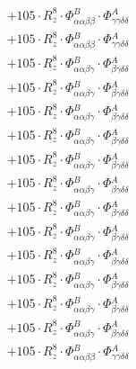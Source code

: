 \documentclass{article}
\begin{document}
\begin{subequations}
\begin{gather}
\begin{array}{c}
 \\[0.2em] 		 + 105 \cdot R_{z}^{8} \cdot \Phi{}^{B}_{\alpha{}\alpha{}\beta{}\beta{}} \cdot \Phi{}^{A}_{\gamma{}\gamma{}\delta{}\delta{}} 
 \\[0.2em] 		 + 105 \cdot R_{z}^{8} \cdot \Phi{}^{B}_{\alpha{}\alpha{}\beta{}\beta{}} \cdot \Phi{}^{A}_{\gamma{}\gamma{}\delta{}\delta{}} 
 \\[0.2em] 		 + 105 \cdot R_{z}^{8} \cdot \Phi{}^{B}_{\alpha{}\alpha{}\beta{}\gamma{}} \cdot \Phi{}^{A}_{\beta{}\gamma{}\delta{}\delta{}} 
 \\[0.2em] 		 + 105 \cdot R_{z}^{8} \cdot \Phi{}^{B}_{\alpha{}\alpha{}\beta{}\gamma{}} \cdot \Phi{}^{A}_{\beta{}\gamma{}\delta{}\delta{}} 
 \\[0.2em] 		 + 105 \cdot R_{z}^{8} \cdot \Phi{}^{B}_{\alpha{}\alpha{}\beta{}\gamma{}} \cdot \Phi{}^{A}_{\beta{}\gamma{}\delta{}\delta{}} 
 \\[0.2em] 		 + 105 \cdot R_{z}^{8} \cdot \Phi{}^{B}_{\alpha{}\alpha{}\beta{}\gamma{}} \cdot \Phi{}^{A}_{\beta{}\gamma{}\delta{}\delta{}} 
 \\[0.2em] 		 + 105 \cdot R_{z}^{8} \cdot \Phi{}^{B}_{\alpha{}\alpha{}\beta{}\gamma{}} \cdot \Phi{}^{A}_{\beta{}\gamma{}\delta{}\delta{}} 
 \\[0.2em] 		 + 105 \cdot R_{z}^{8} \cdot \Phi{}^{B}_{\alpha{}\alpha{}\beta{}\gamma{}} \cdot \Phi{}^{A}_{\beta{}\gamma{}\delta{}\delta{}} 
 \\[0.2em] 		 + 105 \cdot R_{z}^{8} \cdot \Phi{}^{B}_{\alpha{}\alpha{}\beta{}\gamma{}} \cdot \Phi{}^{A}_{\beta{}\gamma{}\delta{}\delta{}} 
 \\[0.2em] 		 + 105 \cdot R_{z}^{8} \cdot \Phi{}^{B}_{\alpha{}\alpha{}\beta{}\gamma{}} \cdot \Phi{}^{A}_{\beta{}\gamma{}\delta{}\delta{}} 
 \\[0.2em] 		 + 105 \cdot R_{z}^{8} \cdot \Phi{}^{B}_{\alpha{}\alpha{}\beta{}\gamma{}} \cdot \Phi{}^{A}_{\beta{}\gamma{}\delta{}\delta{}} 
 \\[0.2em] 		 + 105 \cdot R_{z}^{8} \cdot \Phi{}^{B}_{\alpha{}\alpha{}\beta{}\gamma{}} \cdot \Phi{}^{A}_{\beta{}\gamma{}\delta{}\delta{}} 
 \\[0.2em] 		 + 105 \cdot R_{z}^{8} \cdot \Phi{}^{B}_{\alpha{}\alpha{}\beta{}\gamma{}} \cdot \Phi{}^{A}_{\beta{}\gamma{}\delta{}\delta{}} 
 \\[0.2em] 		 + 105 \cdot R_{z}^{8} \cdot \Phi{}^{B}_{\alpha{}\alpha{}\beta{}\gamma{}} \cdot \Phi{}^{A}_{\beta{}\gamma{}\delta{}\delta{}} 
 \\[0.2em] 		 + 105 \cdot R_{z}^{8} \cdot \Phi{}^{B}_{\alpha{}\alpha{}\beta{}\beta{}} \cdot \Phi{}^{A}_{\gamma{}\gamma{}\delta{}\delta{}} 

\end{array}
\end{gather}
\end{subequations}
\end{document}
